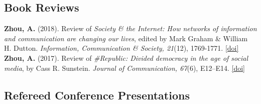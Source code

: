 \documentclass[12pt, letterpaper]{article}
\newcommand{\doi}[1]{\href{#1}{{[doi]}}}
\newcommand{\years}[1]{\marginnote{\normalsize #1}}
\begin{document}
{\subsection*{Book Reviews}

  \years{[2]} \textbf{Zhou, A.} (2018). Review of \textit{Society \& the Internet: How networks of information and communication are changing our lives}, edited by Mark Graham \& William H. Dutton. \textit{Information, Communication \& Society, 21}(12), 1769-1771. \doi{https://doi.org/10.1080/1369118X.2018.1465577}\\
  \years{[1]} \textbf{Zhou, A.} (2017). Review of \textit{\#Republic: Divided democracy in the age of social media}, by Cass R. Sunstein. \textit{Journal of Communication, 67}(6), E12–E14. \doi{https://doi.org/10.1111/jcom.12344}

\subsection*{Refereed Conference Presentations}

}
\end{document}

